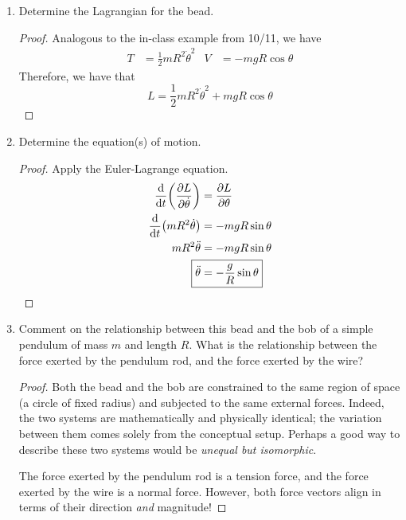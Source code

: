 \documentclass[../psets.tex]{subfiles}
\begin{document}
\begin{enumerate}
    \begin{enumerate}
        \item Determine the Lagrangian for the bead.
        \begin{proof}
            Analogous to the in-class example from 10/11, we have
            \begin{align*}
                T &= \frac{1}{2}mR^2\dot{\theta}^2&
                V &= -mgR\cos\theta
            \end{align*}
            Therefore, we have that
            \begin{equation*}
                \boxed{L = \frac{1}{2}mR^2\dot{\theta}^2+mgR\cos\theta}
            \end{equation*}
        \end{proof}
        \item Determine the equation(s) of motion.
        \begin{proof}
            Apply the Euler-Lagrange equation.
            \begin{align*}
                \dv{t}(\pdv{L}{\dot{\theta}}) &= \pdv{L}{\theta}\\
                \dv{t}(mR^2\dot{\theta}) &= -mgR\sin\theta\\
                mR^2\ddot{\theta} &= -mgR\sin\theta\\
                \Aboxed{\ddot{\theta} &= -\frac{g}{R}\sin\theta}
            \end{align*}
        \end{proof}
        \item Comment on the relationship between this bead and the bob of a simple pendulum of mass $m$ and length $R$. What is the relationship between the force exerted by the pendulum rod, and the force exerted by the wire?
        \begin{proof}
            Both the bead and the bob are constrained to the same region of space (a circle of fixed radius) and subjected to the same external forces. Indeed, the two systems are mathematically and physically identical; the variation between them comes solely from the conceptual setup. Perhaps a good way to describe these two systems would be \emph{unequal but isomorphic}.\par
            The force exerted by the pendulum rod is a tension force, and the force exerted by the wire is a normal force. However, both force vectors align in terms of their direction \emph{and} magnitude!
        \end{proof}
    \end{enumerate}

\end{enumerate}
\end{document}
